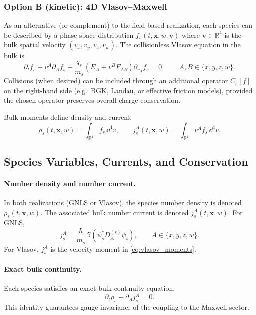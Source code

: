 \documentclass[11pt]{article}
\newcommand{\R}{\mathbb{R}}
\newcommand{\x}{\mathbf{x}}     %
\begin{document}
\subsubsection*{Option B (kinetic): 4D Vlasov--Maxwell}

As an alternative (or complement) to the field-based realization, each species can
be described by a phase-space distribution \(f_s(t,\x,w;\mathbf{v})\) where
\(\mathbf{v}\in\R^4\) is the bulk spatial velocity \((v_x,v_y,v_z,v_w)\). The
collisionless Vlasov equation in the bulk is
\begin{equation}
\partial_t f_s + v^A\partial_A f_s
+ \frac{q_s}{m_s}\left(E_A + v^B F_{AB}\right)\partial_{v_A} f_s
= 0,
\qquad A,B\in\{x,y,z,w\}.
\label{eq:vlasov_4d}
\end{equation}
Collisions (when desired) can be included through an additional operator
\(C_s[f]\) on the right-hand side (e.g.\ BGK, Landau, or effective friction models),
provided the chosen operator preserves overall charge conservation.

Bulk moments define density and current:
\begin{equation}
\rho_s(t,\x,w)=\int_{\R^4} f_s\,\dd^4 v,
\qquad
j_s^A(t,\x,w)=\int_{\R^4} v^A f_s\,\dd^4 v.
\label{eq:vlasov_moments}
\end{equation}

\subsection{Species Variables, Currents, and Conservation}
\label{sec:species_currents}

\paragraph{Number density and number current.}
In both realizations (GNLS or Vlasov), the species number density is denoted
\(\rho_s(t,\x,w)\). The associated bulk number current is denoted \(j_s^A(t,\x,w)\).
For GNLS,
\begin{equation}
j_s^A
=
\frac{\hbar}{m_s}\,\Im\!\left(\psi_s^\ast D_A^{(s)}\psi_s\right),
\qquad
A\in\{x,y,z,w\}.
\label{eq:gnls_number_current}
\end{equation}
For Vlasov, \(j_s^A\) is the velocity moment in \eqref{eq:vlasov_moments}.

\paragraph{Exact bulk continuity.}
Each species satisfies an exact bulk continuity equation,
\begin{equation}
\partial_t \rho_s + \partial_A j_s^A = 0.
\label{eq:bulk_continuity_species}
\end{equation}
This identity guarantees gauge invariance of the coupling to the Maxwell sector.
\end{document}
